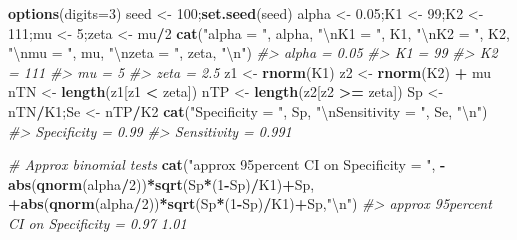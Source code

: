 \documentclass[
]{book}
\newenvironment{Shaded}{\begin{snugshade}}{\end{snugshade}}
\newcommand{\CharTok}[1]{\textcolor[rgb]{0.31,0.60,0.02}{#1}}
\newcommand{\CommentTok}[1]{\textcolor[rgb]{0.56,0.35,0.01}{\textit{#1}}}
\newcommand{\DataTypeTok}[1]{\textcolor[rgb]{0.13,0.29,0.53}{#1}}
\newcommand{\DecValTok}[1]{\textcolor[rgb]{0.00,0.00,0.81}{#1}}
\newcommand{\FloatTok}[1]{\textcolor[rgb]{0.00,0.00,0.81}{#1}}
\newcommand{\KeywordTok}[1]{\textcolor[rgb]{0.13,0.29,0.53}{\textbf{#1}}}
\newcommand{\NormalTok}[1]{#1}
\newcommand{\OperatorTok}[1]{\textcolor[rgb]{0.81,0.36,0.00}{\textbf{#1}}}
\newcommand{\StringTok}[1]{\textcolor[rgb]{0.31,0.60,0.02}{#1}}
\begin{document}
\begin{Shaded}
\begin{Highlighting}[]
\KeywordTok{options}\NormalTok{(}\DataTypeTok{digits=}\DecValTok{3}\NormalTok{)}
\NormalTok{seed \textless{}{-}}\StringTok{ }\DecValTok{100}\NormalTok{;}\KeywordTok{set.seed}\NormalTok{(seed)}
\NormalTok{alpha \textless{}{-}}\StringTok{ }\FloatTok{0.05}\NormalTok{;K1 \textless{}{-}}\StringTok{ }\DecValTok{99}\NormalTok{;K2 \textless{}{-}}\StringTok{ }\DecValTok{111}\NormalTok{;mu \textless{}{-}}\StringTok{ }\DecValTok{5}\NormalTok{;zeta \textless{}{-}}\StringTok{ }\NormalTok{mu}\OperatorTok{/}\DecValTok{2}
\KeywordTok{cat}\NormalTok{(}\StringTok{"alpha = "}\NormalTok{, alpha, }
    \StringTok{"}\CharTok{\textbackslash{}n}\StringTok{K1 = "}\NormalTok{, K1, }
    \StringTok{"}\CharTok{\textbackslash{}n}\StringTok{K2 = "}\NormalTok{, K2, }
    \StringTok{"}\CharTok{\textbackslash{}n}\StringTok{mu = "}\NormalTok{, mu, }
    \StringTok{"}\CharTok{\textbackslash{}n}\StringTok{zeta = "}\NormalTok{, zeta, }\StringTok{"}\CharTok{\textbackslash{}n}\StringTok{"}\NormalTok{)}
\CommentTok{\#\textgreater{} alpha =  0.05 }
\CommentTok{\#\textgreater{} K1 =  99 }
\CommentTok{\#\textgreater{} K2 =  111 }
\CommentTok{\#\textgreater{} mu =  5 }
\CommentTok{\#\textgreater{} zeta =  2.5}
\NormalTok{z1 \textless{}{-}}\StringTok{ }\KeywordTok{rnorm}\NormalTok{(K1)}
\NormalTok{z2 \textless{}{-}}\StringTok{ }\KeywordTok{rnorm}\NormalTok{(K2) }\OperatorTok{+}\StringTok{ }\NormalTok{mu}
\NormalTok{nTN \textless{}{-}}\StringTok{ }\KeywordTok{length}\NormalTok{(z1[z1 }\OperatorTok{\textless{}}\StringTok{ }\NormalTok{zeta])}
\NormalTok{nTP \textless{}{-}}\StringTok{ }\KeywordTok{length}\NormalTok{(z2[z2 }\OperatorTok{\textgreater{}=}\StringTok{ }\NormalTok{zeta])}
\NormalTok{Sp \textless{}{-}}\StringTok{ }\NormalTok{nTN}\OperatorTok{/}\NormalTok{K1;Se \textless{}{-}}\StringTok{ }\NormalTok{nTP}\OperatorTok{/}\NormalTok{K2}
\KeywordTok{cat}\NormalTok{(}\StringTok{"Specificity = "}\NormalTok{, Sp, }
    \StringTok{"}\CharTok{\textbackslash{}n}\StringTok{Sensitivity = "}\NormalTok{, Se, }\StringTok{"}\CharTok{\textbackslash{}n}\StringTok{"}\NormalTok{)}
\CommentTok{\#\textgreater{} Specificity =  0.99 }
\CommentTok{\#\textgreater{} Sensitivity =  0.991}

\CommentTok{\# Approx binomial tests}
\KeywordTok{cat}\NormalTok{(}\StringTok{"approx 95percent CI on Specificity = "}\NormalTok{, }
    \OperatorTok{{-}}\KeywordTok{abs}\NormalTok{(}\KeywordTok{qnorm}\NormalTok{(alpha}\OperatorTok{/}\DecValTok{2}\NormalTok{))}\OperatorTok{*}\KeywordTok{sqrt}\NormalTok{(Sp}\OperatorTok{*}\NormalTok{(}\DecValTok{1}\OperatorTok{{-}}\NormalTok{Sp)}\OperatorTok{/}\NormalTok{K1)}\OperatorTok{+}\NormalTok{Sp, }
    \OperatorTok{+}\KeywordTok{abs}\NormalTok{(}\KeywordTok{qnorm}\NormalTok{(alpha}\OperatorTok{/}\DecValTok{2}\NormalTok{))}\OperatorTok{*}\KeywordTok{sqrt}\NormalTok{(Sp}\OperatorTok{*}\NormalTok{(}\DecValTok{1}\OperatorTok{{-}}\NormalTok{Sp)}\OperatorTok{/}\NormalTok{K1)}\OperatorTok{+}\NormalTok{Sp,}\StringTok{"}\CharTok{\textbackslash{}n}\StringTok{"}\NormalTok{)}
\CommentTok{\#\textgreater{} approx 95percent CI on Specificity =  0.97 1.01}


\end{Highlighting}
\end{Shaded}
\end{document}

